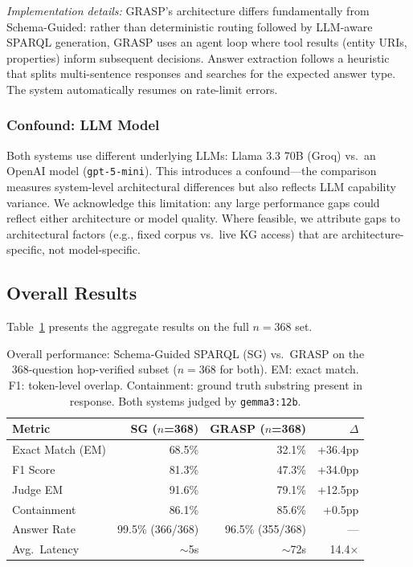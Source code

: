 \textit{Implementation details:} GRASP's architecture differs fundamentally from Schema-Guided: rather than deterministic routing followed by LLM-aware SPARQL generation, GRASP uses an agent loop where tool results (entity URIs, properties) inform subsequent decisions. Answer extraction follows a heuristic that splits multi-sentence responses and searches for the expected answer type. The system automatically resumes on rate-limit errors.

\subsubsection{Confound: LLM Model}

Both systems use different underlying LLMs: Llama 3.3 70B (Groq) vs.\ an OpenAI model (\texttt{gpt-5-mini}). This introduces a confound—the comparison measures system-level architectural differences but also reflects LLM capability variance. We acknowledge this limitation: any large performance gaps could reflect either architecture or model quality. Where feasible, we attribute gaps to architectural factors (e.g., fixed corpus vs.\ live KG access) that are architecture-specific, not model-specific.

\subsection{Overall Results}
\label{sec:overall-results}

Table~\ref{tab:overall-performance} presents the aggregate results on the full $n=368$ set.

\begin{table}[h]
\centering
\begin{tabular}{lrrr}
\toprule
\textbf{Metric} & \textbf{SG} ($n$=368) & \textbf{GRASP} ($n$=368) & \textbf{$\Delta$} \\
\midrule
Exact Match (EM) & 68.5\% & 32.1\% & +36.4pp \\
F1 Score & 81.3\% & 47.3\% & +34.0pp \\
Judge EM & 91.6\% & 79.1\% & +12.5pp \\
Containment & 86.1\% & 85.6\% & +0.5pp \\
Answer Rate & 99.5\% (366/368) & 96.5\% (355/368) & --- \\
Avg.\ Latency & $\sim$5s & $\sim$72s & 14.4$\times$ \\
\bottomrule
\end{tabular}
\caption{Overall performance: Schema-Guided SPARQL (SG) vs.\ GRASP on the 368-question hop-verified subset ($n=368$ for both). EM: exact match. F1: token-level overlap. Containment: ground truth substring present in response. Both systems judged by \texttt{gemma3:12b}.}
\label{tab:overall-performance}
\end{table}

